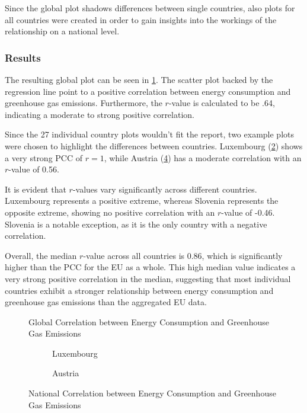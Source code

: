 \documentclass{article}
\begin{document}
Since the global plot shadows differences between single countries, also plots for all countries were created in order to gain
insights into the workings of the relationship on a national level.

\subsubsection*{Results}
The resulting global plot can be seen in \cref{plt:global_consumption_vs_emissions}.
The scatter plot backed by the regression line point to a positive correlation between energy consumption and greenhouse gas emissions.
Furthermore, the $r$-value is calculated to be .64, indicating a moderate to strong positive correlation.

Since the 27 individual country plots wouldn't fit the report, two example plots were chosen to highlight the differences between countries.
Luxembourg (\cref{plt:LU_consumption_vs_emissions}) shows a very strong PCC of $r=1$, while Austria (\cref{plt:AT_consumption_vs_emissions})
has a moderate correlation with an $r$-value of 0.56.

It is evident that $r$-values vary significantly across different countries.
Luxembourg represents a positive extreme, whereas Slovenia represents the opposite extreme,
showing no positive correlation with an $r$-value of -0.46. Slovenia is a notable exception,
as it is the only country with a negative correlation.

Overall, the median $r$-value across all countries is 0.86, which is significantly higher than the PCC for the EU as a whole.
This high median value indicates a very strong positive correlation in the median, suggesting that most individual countries exhibit a stronger
relationship between energy consumption and greenhouse gas emissions than the aggregated EU data.

\begin{figure}
    \centering
    \resizebox{.6\textwidth}{!}{}
    \caption{Global Correlation between Energy Consumption and Greenhouse Gas Emissions}
    \label{plt:global_consumption_vs_emissions}
\end{figure}

\begin{figure}
    \centering
    \begin{subfigure}[b]{0.49\textwidth}
        \centering
        \resizebox{\textwidth}{!}{}
        \caption{Luxembourg}
        \label{plt:LU_consumption_vs_emissions}
    \end{subfigure}
    \hfill
    \begin{subfigure}[b]{0.49\textwidth}
        \centering
        \resizebox{\textwidth}{!}{}
        \caption{Austria}
        \label{plt:AT_consumption_vs_emissions}
    \end{subfigure}
    \caption{National Correlation between Energy Consumption and Greenhouse Gas Emissions}
\end{figure}
\end{document}
